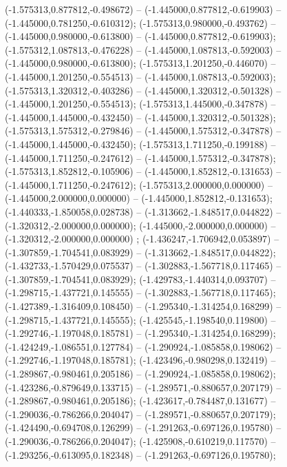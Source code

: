  (-1.575313,0.877812,-0.498672) -- (-1.445000,0.877812,-0.619903) -- (-1.445000,0.781250,-0.610312);
 (-1.575313,0.980000,-0.493762) -- (-1.445000,0.980000,-0.613800) -- (-1.445000,0.877812,-0.619903);
 (-1.575312,1.087813,-0.476228) -- (-1.445000,1.087813,-0.592003) -- (-1.445000,0.980000,-0.613800);
 (-1.575313,1.201250,-0.446070) -- (-1.445000,1.201250,-0.554513) -- (-1.445000,1.087813,-0.592003);
 (-1.575313,1.320312,-0.403286) -- (-1.445000,1.320312,-0.501328) -- (-1.445000,1.201250,-0.554513);
 (-1.575313,1.445000,-0.347878) -- (-1.445000,1.445000,-0.432450) -- (-1.445000,1.320312,-0.501328);
 (-1.575313,1.575312,-0.279846) -- (-1.445000,1.575312,-0.347878) -- (-1.445000,1.445000,-0.432450);
 (-1.575313,1.711250,-0.199188) -- (-1.445000,1.711250,-0.247612) -- (-1.445000,1.575312,-0.347878);
 (-1.575313,1.852812,-0.105906) -- (-1.445000,1.852812,-0.131653) -- (-1.445000,1.711250,-0.247612);
 (-1.575313,2.000000,0.000000) -- (-1.445000,2.000000,0.000000) -- (-1.445000,1.852812,-0.131653);
 (-1.440333,-1.850058,0.028738) -- (-1.313662,-1.848517,0.044822) -- (-1.320312,-2.000000,0.000000);
 (-1.445000,-2.000000,0.000000) -- (-1.320312,-2.000000,0.000000) ;
 (-1.436247,-1.706942,0.053897) -- (-1.307859,-1.704541,0.083929) -- (-1.313662,-1.848517,0.044822);
 (-1.432733,-1.570429,0.075537) -- (-1.302883,-1.567718,0.117465) -- (-1.307859,-1.704541,0.083929);
 (-1.429783,-1.440314,0.093707) -- (-1.298715,-1.437721,0.145555) -- (-1.302883,-1.567718,0.117465);
 (-1.427389,-1.316409,0.108450) -- (-1.295340,-1.314254,0.168299) -- (-1.298715,-1.437721,0.145555);
 (-1.425545,-1.198540,0.119800) -- (-1.292746,-1.197048,0.185781) -- (-1.295340,-1.314254,0.168299);
 (-1.424249,-1.086551,0.127784) -- (-1.290924,-1.085858,0.198062) -- (-1.292746,-1.197048,0.185781);
 (-1.423496,-0.980298,0.132419) -- (-1.289867,-0.980461,0.205186) -- (-1.290924,-1.085858,0.198062);
 (-1.423286,-0.879649,0.133715) -- (-1.289571,-0.880657,0.207179) -- (-1.289867,-0.980461,0.205186);
 (-1.423617,-0.784487,0.131677) -- (-1.290036,-0.786266,0.204047) -- (-1.289571,-0.880657,0.207179);
 (-1.424490,-0.694708,0.126299) -- (-1.291263,-0.697126,0.195780) -- (-1.290036,-0.786266,0.204047);
 (-1.425908,-0.610219,0.117570) -- (-1.293256,-0.613095,0.182348) -- (-1.291263,-0.697126,0.195780);
